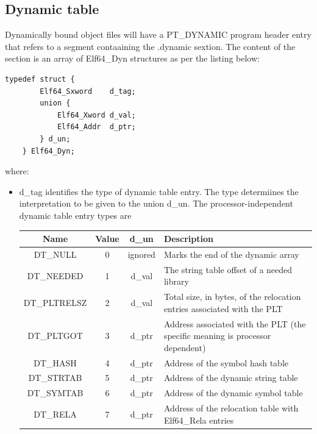 \documentclass[paper=a4, fontsize=11pt]{report} %
\numberwithin{equation}{section} %
\numberwithin{figure}{section} %
\numberwithin{table}{section} %
\begin{document}
\subsection{Dynamic table}
Dynamically bound object files will have a {\ttfamily PT\_DYNAMIC} program 
header entry that refers to a segment contaaining the {\ttfamily .dynamic} 
sextion. The content of the section is an array of {\ttfamily Elf64\_Dyn} 
structures as per the listing below:
\begin{lstlisting}[style=ansic, caption={Dynamic Table Structure}, 
label=elf64dyn]
	typedef struct {
        Elf64_Sxword    d_tag;
        union {
            Elf64_Xword d_val;
            Elf64_Addr  d_ptr;
        } d_un;
	} Elf64_Dyn;
\end{lstlisting}
where:
\begin{itemize}
	\item {\ttfamily d\_tag} identifies the type of dynamic table entry. The 
	type determiines the interpretation to be given to the union {\ttfamily 
	d\_un}. The processor-independent dynamic table entry types are
\begin{table}[!htbp]\begin{center}\begin{tabular}{|c|c|c|p{10cm}|}
\hline
\textbf{Name} & \textbf{Value} & \textbf{d\_un} & \textbf{Description}\\ \hline
{\ttfamily DT\_NULL} & 0 & ignored & Marks the end of the dynamic array\\
\hline
{\ttfamily DT\_NEEDED} & 1 & {\ttfamily d\_val} & The string table offset of a 
needed library\\ \hline
{\ttfamily DT\_PLTRELSZ} & 2 & {\ttfamily d\_val} & Total size, in bytes, of 
the relocation entries associated with the PLT\\ \hline
{\ttfamily DT\_PLTGOT} & 3 & {\ttfamily d\_ptr} & Address associated with the 
PLT (the specific meaning is processor dependent)\\ \hline
{\ttfamily DT\_HASH} & 4 & {\ttfamily d\_ptr} & Address of the symbol hash 
table\\ \hline
{\ttfamily DT\_STRTAB} & 5 & {\ttfamily d\_ptr} & Address of the dynamic string 
table\\ \hline
{\ttfamily DT\_SYMTAB} & 6 & {\ttfamily d\_ptr} & Address of the dynamic symbol 
table\\ \hline
{\ttfamily DT\_RELA} & 7 & {\ttfamily d\_ptr} & Address of the relocation table 
with {\ttfamily Elf64\_Rela} entries\\ \hline

\end{tabular}
\end{center}
\end{table}
\end{itemize}
\end{document}
